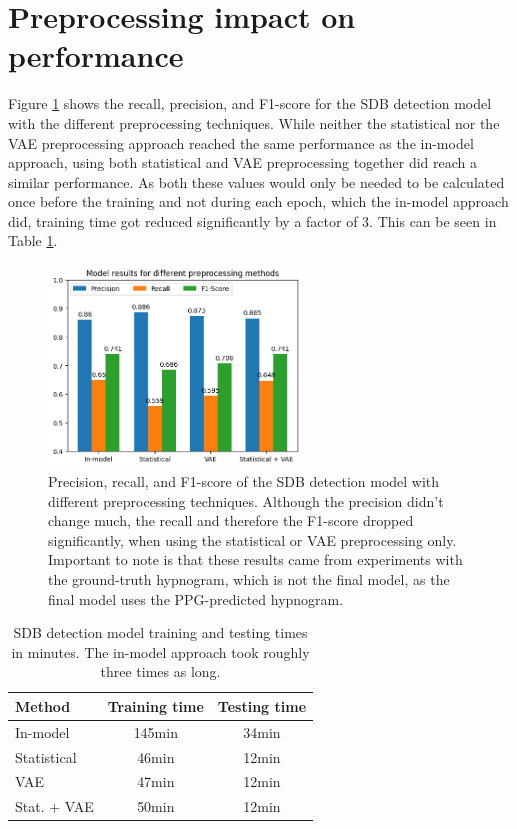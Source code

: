 \section{Preprocessing impact on performance}

Figure \ref{fig:preprocessingresults} shows the recall, precision, and F1-score for the SDB detection model with the different preprocessing techniques. While neither the statistical nor the VAE preprocessing approach reached the same performance as the in-model approach, using both statistical and VAE preprocessing together did reach a similar performance. As both these values would only be needed to be calculated once before the training and not during each epoch, which the in-model approach did, training time got reduced significantly by a factor of 3. This can be seen in Table \ref{tab:preprocessing-times}.

\begin{figure}
    \centering
    \includegraphics[width=0.6\textwidth]{images/PreprocessingResults}
    \caption{Precision, recall, and F1-score of the SDB detection model with different preprocessing techniques. Although the precision didn't change much, the recall and therefore the F1-score dropped significantly, when using the statistical or VAE preprocessing only.
    Important to note is that these results came from experiments with the ground-truth hypnogram, which is not the final model, as the final model uses the PPG-predicted hypnogram.}
    \label{fig:preprocessingresults}
\end{figure}

\renewcommand{\arraystretch}{1.5}
\begin{table}
    \centering
    \begin{tabular}{ l c c }
        Method & Training time & Testing time \\
        \hline
        In-model & 145min & 34min \\
        Statistical & 46min & 12min \\
        VAE & 47min & 12min \\
        Stat. + VAE & 50min & 12min \\
    \end{tabular}
    \caption{SDB detection model training and testing times in minutes. The in-model approach took roughly three times as long. \label{tab:preprocessing-times}}
\end{table}

